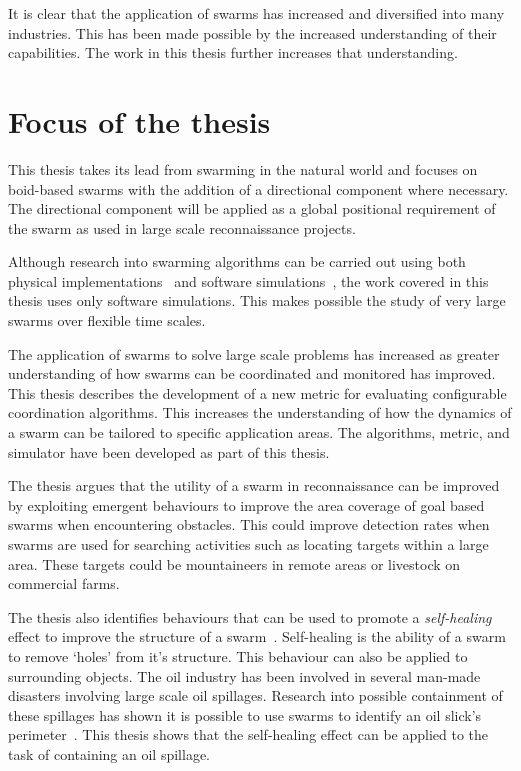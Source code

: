 It is clear that the application of swarms has increased and diversified into many industries. This has been made possible by the increased understanding of their capabilities. The work in this thesis further increases that understanding.

\section{Focus of the thesis}
This thesis takes its lead from swarming in the natural world and focuses on boid-based swarms with the addition of a directional component where necessary. The directional component will be applied as a global positional requirement of the swarm as used in large scale reconnaissance projects.

Although research into swarming algorithms can be carried out using both physical implementations~\cite{DOR:09, DTGT:04} and software simulations~\cite{BAF:06, GP:02}, the work covered in this thesis uses only software simulations. This makes possible the study of very large swarms over flexible time scales.

The application of swarms to solve large scale problems has increased as greater understanding of how swarms can be coordinated and monitored has improved. This thesis describes the development of a new metric for evaluating configurable coordination algorithms. This increases the understanding of how the dynamics of a swarm can be tailored to specific application areas. The algorithms, metric, and simulator have been developed as part of this thesis.

The thesis argues that the utility of a swarm in reconnaissance can be improved by exploiting emergent behaviours to improve the area coverage of goal based swarms when encountering obstacles. This could improve detection rates when swarms are used for searching  activities such as locating targets within a large area. These targets could be mountaineers in remote areas or livestock on commercial farms. 

The thesis also identifies behaviours that can be used to promote a \emph{self-healing} effect to improve the structure of a swarm~\cite{RS:08}. Self-healing is the ability of a swarm to remove `holes' from it's structure. This behaviour can also be applied to surrounding objects. The oil industry has been involved in several man-made disasters involving large scale oil spillages. Research into possible containment of these spillages has shown it is possible to use swarms to identify an oil slick's perimeter~\cite{ZFG:13}. This thesis shows that the self-healing effect can be applied to the task of containing an oil spillage.
 
